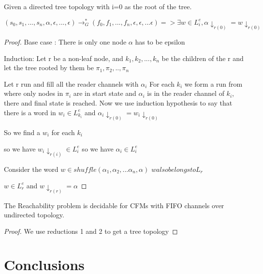 \documentclass[a4paper,UKenglish,cleveref, autoref, thm-restate]{lipics-v2019}
\begin{document}
   

   
\begin{lemma}\label{testenv-lemma}
Given a directed tree topology with i=0 as the root of the tree.

$(s_0, s_1, ...,s_n, \alpha, \epsilon, ...,\epsilon) \rightarrow_G^* (f_0, f_1, ..., f_n, \epsilon, \epsilon, ... \epsilon) => \exists w \in L_i^e,   \alpha \downarrow_{r(0)} = w \downarrow_{r(0)}$

   \end{lemma}
   
   
   \begin{proof}
    Base case : There is only one node $\alpha$ has to be epsilon 

    Induction: 
    Let r be a non-leaf node, and $k_1, k_2, ..., k_n$ be the children of the r and let the tree rooted by them be $\pi_1, \pi_2, .., \pi_n$ 
    
    Let r run and fill all the reader channels with $\alpha_i$
    For each $k_i$ we form a run from where only nodes in $\pi_i$ are in start state and $\alpha_i$ is in the reader channel of $k_i$, there and final state is reached. Now we use induction hypothesis to say that there is a word in $w_i \in L_{k_i}^e$ and $\alpha_i \downarrow_{r(0)} = w_i \downarrow_{r(0)}$
    
    So we find a $w_i$ for each $k_i$
    
    so we have $w_i \downarrow_{r(i)} \in L_i^e$ 
    so we have  $\alpha_i \in L_i^e$ 
    
    Consider the word $w \in shuffle(\alpha_1, \alpha_2,...\alpha_n, \alpha)$
    $w also belongs to L_r$
    
    $w \in L_r^e$ and $w \downarrow_{r(r)} = \alpha $ 
    
    
    
    
   \end{proof}
    

   
\begin{theorem}\label{testenv-theorem}
    The Reachability problem is decidable for CFMs with FIFO channels over undirected topology. 
   \end{theorem}

   
\begin{proof}
    We use reductions 1 and 2 to get a tree topology
    
   \end{proof}

\section{Conclusions}
\end{document}
